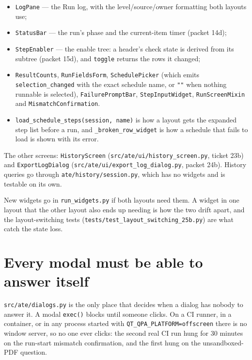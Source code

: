 \begin{itemize}
  \item \texttt{LogPane} --- the Run log, with the level/source/owner formatting both layouts use;
  \item \texttt{StatusBar} --- the run's phase and the current-item timer (packet 14d);
  \item \texttt{StepEnabler} --- the enable tree: a header's check state is derived from its subtree
    (packet 15d), and \texttt{toggle} returns the rows it changed;
  \item \texttt{ResultCounts}, \texttt{RunFieldsForm}, \texttt{SchedulePicker} (which emits
    \texttt{selection\_changed} with the exact schedule name, or \texttt{""} when nothing runnable is
    selected), \texttt{FailurePromptBar}, \texttt{StepInputWidget}, \texttt{RunScreenMixin} and
    \texttt{MismatchConfirmation}.
  \item \texttt{load\_\allowbreak{}schedule\_\allowbreak{}steps(session, name)} is how a layout gets the expanded step list before
    a run, and \texttt{\_\allowbreak{}broken\_\allowbreak{}row\_\allowbreak{}widget} is how a schedule that fails to load is shown with its error.
\end{itemize}

The other screens: \texttt{HistoryScreen} (\texttt{src/\allowbreak{}ate/\allowbreak{}ui/\allowbreak{}history\_\allowbreak{}screen.py}, ticket 23b) and
\texttt{ExportLogDialog} (\texttt{src/\allowbreak{}ate/\allowbreak{}ui/\allowbreak{}export\_\allowbreak{}log\_\allowbreak{}dialog.py}, packet 24b). History queries go
through \texttt{ate/\allowbreak{}history/\allowbreak{}session.py}, which has no widgets and is testable on its own.

New widgets go in \texttt{run\_widgets.py} if both layouts need them. A widget in one layout that the
other layout also ends up needing is how the two drift apart, and the layout-switching tests
(\texttt{tests/\allowbreak{}test\_\allowbreak{}layout\_\allowbreak{}switching\_\allowbreak25b.py}) are what catch the state loss.

\section{Every modal must be able to answer itself}

\texttt{src/ate/dialogs.py} is the only place that decides when a dialog has nobody to answer it. A modal
\texttt{exec()} blocks until someone clicks. On a CI runner, in a container, or in any process started
with \texttt{QT\_\allowbreak{}QPA\_\allowbreak{}PLATFORM=offscreen} there is no window server, so no one ever clicks: the second real
CI run hung for 30 minutes on the run-start mismatch confirmation, and the first hung on the
unsandboxed-PDF question.

